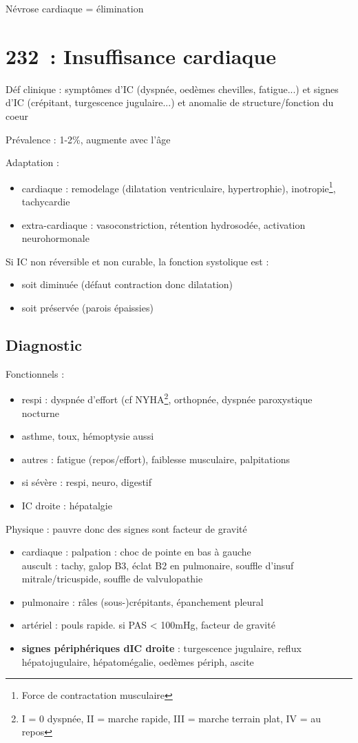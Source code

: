 \documentclass{article}
\begin{document}
Névrose cardiaque = élimination

\section{232 : Insuffisance cardiaque}%
\label{sec:insuffisance_cardiaque}
Déf clinique : symptômes d'\gls{IC} (dyspnée, oedèmes
chevilles, fatigue...) et signes d'IC (crépitant, turgescence jugulaire...)
et anomalie de structure/fonction du coeur

Prévalence : 1-2\%, augmente avec l'âge

Adaptation :
\begin{itemize}
  \item cardiaque : remodelage (dilatation ventriculaire, hypertrophie), \inc
    inotropie\footnote{Force de contractation musculaire}, tachycardie
  \item extra-cardiaque : vasoconstriction, rétention hydrosodée, activation
    neurohormonale
\end{itemize}
Si IC non réversible et non curable, la fonction systolique est :
\begin{itemize}
  \item soit diminuée (défaut contraction donc dilatation)
  \item soit préservée (parois épaissies)
\end{itemize}

\subsection{Diagnostic}
Fonctionnels :
\begin{itemize}
  \item respi : dyspnée d'effort (cf NYHA\footnote{I = 0 dyspnée, II = marche
      rapide, III = marche terrain plat, IV = au repos}, orthopnée, dyspnée paroxystique nocturne
  \item \danger{} asthme, toux, hémoptysie aussi 
  \item autres : fatigue (repos/effort), faiblesse musculaire, palpitations
  \item si sévère : respi, neuro, digestif
  \item IC droite : hépatalgie
\end{itemize}
Physique : pauvre donc des signes sont facteur de gravité
\begin{itemize}
  \item cardiaque : palpation : choc de pointe en bas à gauche\\
    auscult : tachy, galop B3, éclat B2 en pulmonaire, souffle d'insuf
    mitrale/tricuspide, souffle de valvulopathie
  \item pulmonaire : râles (sous-)crépitants, épanchement pleural
  \item artériel : pouls rapide. si PAS < 100mHg, facteur de gravité
  \item \textbf{signes périphériques dIC droite} : turgescence jugulaire, reflux
    hépatojugulaire, hépatomégalie, oedèmes périph, ascite
\end{itemize}
\end{document}
